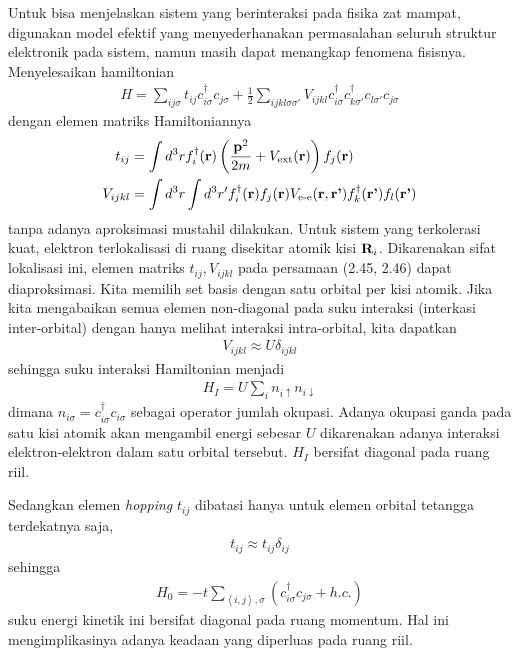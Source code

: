 Untuk bisa menjelaskan sistem yang berinteraksi pada fisika zat mampat, digunakan model efektif yang menyederhanakan permasalahan seluruh struktur elektronik pada sistem, namun masih dapat menangkap fenomena fisisnya. Menyelesaikan hamiltonian 
\begin{align}
H = \sum_{ij\sigma} t_{ij} c^\dagger_{i\sigma} c_{j\sigma} + \frac{1}{2} \sum_{ijkl\sigma\sigma'} V_{ijkl} c^\dagger_{i\sigma} c^\dagger_{k\sigma'} c_{l\sigma'} c_{j\sigma}
\end{align}
dengan elemen matriks Hamiltoniannya
\begin{align}
t_{ij} &= \int d^3r f^\dagger_i(\textbf{r}) \left( \frac{\textbf{p}^2}{2m} + V_\text{ext}(\textbf{r}) \right) f_j(\textbf{r})\\
V_{ijkl} &= \int d^3r \int d^3r' f^\dagger_i(\textbf{r}) f_j(\textbf{r}) V_{\text{e-e}}(\textbf{r},\textbf{r'}) f^\dagger_k(\textbf{r'})f_l(\textbf{r'})
\end{align}
tanpa adanya aproksimasi mustahil dilakukan. Untuk sistem yang terkolerasi kuat, elektron terlokalisasi di ruang disekitar atomik kisi $\textbf{R}_i$. Dikarenakan sifat lokalisasi ini, elemen matriks $t_{ij}, V_{ijkl}$ pada persamaan (2.45, 2.46) dapat diaproksimasi. Kita memilih set basis dengan satu orbital per kisi atomik. Jika kita mengabaikan semua elemen non-diagonal pada suku interaksi (interkasi inter-orbital) dengan hanya melihat interaksi intra-orbital, kita dapatkan
\begin{align}
V_{ijkl} \approx U\delta_{ijkl}
\end{align} 
sehingga suku interaksi Hamiltonian menjadi
\begin{align}
H_I = U\sum_i n_{i\uparrow} n_{i\downarrow}
\end{align}
dimana $n_{i\sigma} = c^\dagger_{i\sigma} c_{i\sigma}$ sebagai operator jumlah okupasi. Adanya okupasi ganda pada satu kisi atomik akan mengambil energi sebesar $U$ dikarenakan adanya interaksi elektron-elektron dalam satu orbital tersebut. $H_I$ bersifat diagonal pada ruang riil. 

Sedangkan elemen \textit{hopping} $t_{ij}$ dibatasi hanya untuk elemen orbital tetangga terdekatnya saja,
\begin{align}
t_{ij} \approx t_{ij}\delta_{ij}
\end{align}
sehingga
\begin{align}
H_0 = - t \sum_{\left\langle i,j \right\rangle, \sigma} \left( c^\dagger_{i\sigma} c_{j\sigma} + h.c. \right)
\end{align}
suku energi kinetik ini bersifat diagonal pada ruang momentum. Hal ini mengimplikasinya adanya keadaan yang diperluas pada ruang riil.


